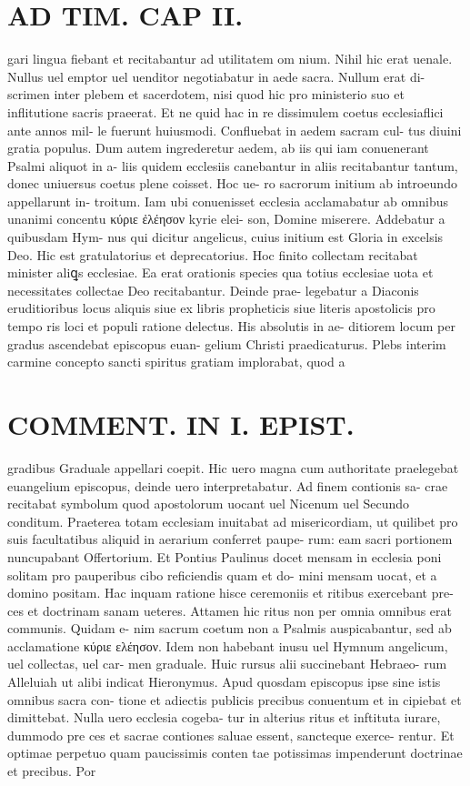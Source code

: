 \documentclass{article}
\begin{document}
\begin{pages}
\section*{AD TIM. CAP II. }
\marginpar{[ p.108 ]}\pstart gari lingua fiebant et recitabantur ad utilitatem om nium. Nihil hic erat uenale. Nullus uel emptor uel uenditor negotiabatur in aede sacra. Nullum erat di- scrimen inter plebem et sacerdotem, nisi quod hic pro ministerio suo et inflitutione sacris praeerat. Et ne quid hac in re dissimulem coetus ecclesiaflici ante annos mil- le fuerunt huiusmodi. Confluebat in aedem sacram cul- tus diuini gratia populus. Dum autem ingrederetur aedem, ab iis qui iam conuenerant Psalmi aliquot in a- liis quidem ecclesiis canebantur in aliis recitabantur tantum, donec uniuersus coetus plene coisset. Hoc ue- ro sacrorum initium ab introeundo appellarunt in- troitum. Iam ubi conuenisset ecclesia acclamabatur ab omnibus unanimi concentu κύριε ἐλέησον kyrie elei- son, Domine miserere. Addebatur a quibusdam Hym- nus qui dicitur angelicus, cuius initium est Gloria in excelsis Deo. Hic est gratulatorius et deprecatorius. Hoc finito collectam recitabat minister aliꝗs ecclesiae. Ea erat orationis species qua totius ecclesiae uota et necessitates collectae Deo recitabantur. Deinde prae- legebatur a Diaconis eruditioribus locus aliquis siue ex libris propheticis siue literis apostolicis pro tempo ris loci et populi ratione delectus. His absolutis in ae- ditiorem locum per gradus ascendebat episcopus euan- gelium Christi praedicaturus. Plebs interim carmine concepto sancti spiritus gratiam implorabat, quod a  \pend
\section*{COMMENT. IN I. EPIST. }\pstart gradibus Graduale appellari coepit. Hic uero magna cum authoritate praelegebat euangelium episcopus, deinde uero interpretabatur. Ad finem contionis sa- crae recitabat symbolum quod apostolorum uocant uel Nicenum uel Secundo conditum. Praeterea totam ecclesiam inuitabat ad misericordiam, ut quilibet pro suis facultatibus aliquid in aerarium conferret paupe- rum: eam sacri portionem nuncupabant Offertorium. Et Pontius Paulinus docet mensam in ecclesia poni solitam pro pauperibus cibo reficiendis quam et do- mini mensam uocat, et a domino positam. Hac inquam ratione hisce ceremoniis et ritibus exercebant pre- ces et doctrinam sanam ueteres. Attamen hic ritus non per omnia omnibus erat communis. Quidam e- nim sacrum coetum non a Psalmis auspicabantur, sed ab acclamatione κύριε ελέησον. Idem non habebant inusu uel Hymnum angelicum, uel collectas, uel car- men graduale. Huic rursus alii succinebant Hebraeo- rum Alleluiah ut alibi indicat Hieronymus. Apud quosdam episcopus ipse sine istis omnibus sacra con- tione et adiectis publicis precibus conuentum et in cipiebat et dimittebat. Nulla uero ecclesia cogeba- tur in alterius ritus et inftituta iurare, dummodo pre ces et sacrae contiones saluae essent, sancteque exerce- rentur. Et optimae perpetuo quam paucissimis conten tae potissimas impenderunt doctrinae et precibus. Por  \pend

\end{pages}
\end{document}
